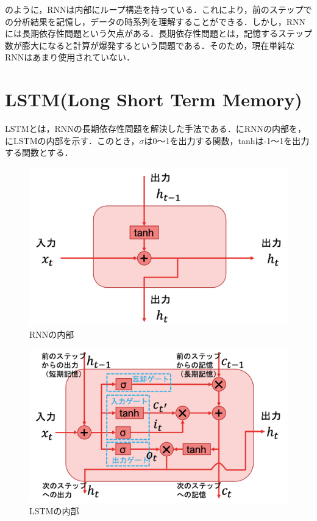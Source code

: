 \documentclass{eithesis}
\begin{document}
    のように，RNNは内部にループ構造を持っている．これにより，前のステップでの分析結果を記憶し，データの時系列を理解することができる．しかし，RNNには長期依存性問題という欠点がある．長期依存性問題とは，記憶するステップ数が膨大になると計算が爆発するという問題である．そのため，現在単純なRNNはあまり使用されていない．

  \section{LSTM(Long Short Term Memory)}
    LSTMとは，RNNの長期依存性問題を解決した手法である．にRNNの内部を，にLSTMの内部を示す．このとき，$\sigma$は0〜1を出力する関数，tanhは-1〜1を出力する関数とする．
    \begin{figure}[htbp]
      \centering
      \includegraphics[width=14cm]{./images/RNN_inner.png}
      \caption{RNNの内部}
      \label{fig_RNN_inner}
    \end{figure}
    \begin{figure}[htbp]
      \centering
      \includegraphics[width=14cm]{./images/LSTM_inner.png}
      \caption{LSTMの内部}
      \label{fig_LSTM_inner}
    \end{figure}
\end{document}
